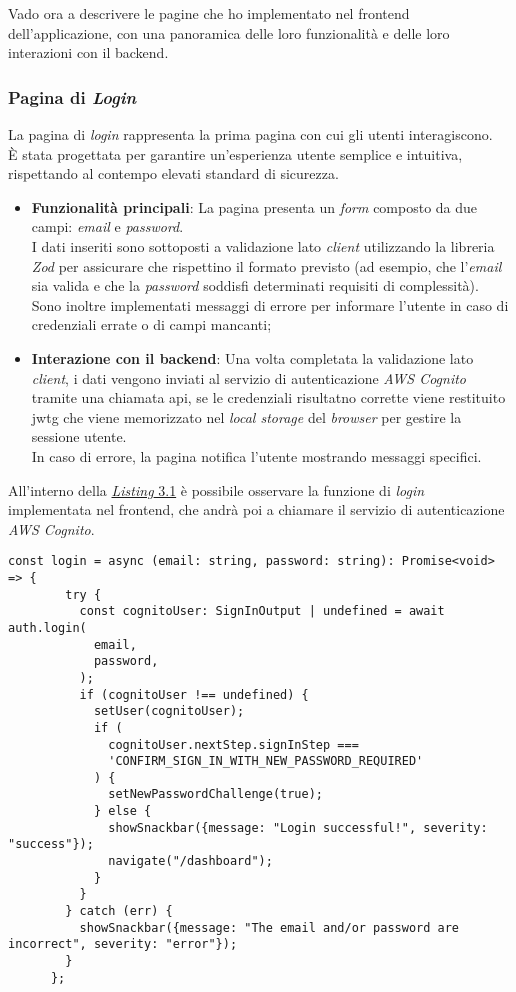 \noindent Vado ora a descrivere le pagine che ho implementato nel \gls{frontend} dell'applicazione, con una panoramica delle loro funzionalità e delle loro interazioni con il \gls{backend}.

\subsubsection{Pagina di \textit{Login}}
La pagina di \textit{login} rappresenta la prima pagina con cui gli utenti interagiscono.\\
È stata progettata per garantire un'esperienza utente semplice e intuitiva, rispettando al contempo elevati standard di sicurezza.
\begin{itemize}
    \item \textbf{Funzionalità principali}: La pagina presenta un \textit{form} composto da due campi: \textit{email} e \textit{password}.\\
    I dati inseriti sono sottoposti a validazione lato \textit{client} utilizzando la libreria \textit{Zod} per assicurare che rispettino il formato previsto (ad esempio, che l'\textit{email} sia valida e che la \textit{password} soddisfi determinati requisiti di complessità). \\
    Sono inoltre implementati messaggi di errore per informare l'utente in caso di credenziali errate o di campi mancanti;
    \item \textbf{Interazione con il \gls{backend}}: Una volta completata la validazione lato \textit{client}, i dati vengono inviati al servizio di autenticazione \textit{AWS Cognito} tramite una chiamata \gls{api}, se le credenziali risultatno corrette viene restituito \gls{jwtg} che viene memorizzato nel \textit{local storage} del \textit{browser} per gestire la sessione utente. \\
    In caso di errore, la pagina notifica l'utente mostrando messaggi specifici.
\end{itemize}

\noindent All'interno della {\hyperref[lst:login-frontend]{\textit{Listing} 3.1}} è possibile osservare la funzione di \textit{login} implementata nel \gls{frontend}, che andrà poi a chiamare il servizio di autenticazione \textit{AWS Cognito}.

\begin{lstlisting}[caption={Funzione di \textit{login} nel \gls{frontend}}, label={lst:login-frontend}]
    const login = async (email: string, password: string): Promise<void> => {
        try {
          const cognitoUser: SignInOutput | undefined = await auth.login(
            email,
            password,
          );
          if (cognitoUser !== undefined) {
            setUser(cognitoUser);
            if (
              cognitoUser.nextStep.signInStep ===
              'CONFIRM_SIGN_IN_WITH_NEW_PASSWORD_REQUIRED'
            ) {
              setNewPasswordChallenge(true);
            } else {
              showSnackbar({message: "Login successful!", severity: "success"});
              navigate("/dashboard");
            }
          }
        } catch (err) {
          showSnackbar({message: "The email and/or password are incorrect", severity: "error"});
        }
      };
    \end{lstlisting}

